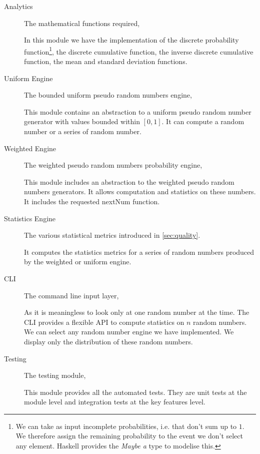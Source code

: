 \documentclass[12pt,a4paper,titlepage]{article}
\begin{document}
\begin{description}
	\item[Analytics] The mathematical functions required,
	
	In this module we have the implementation of the discrete 
	probability function\footnote{
	We can take as input incomplete probabilities, i.e. that
	don't sum up to $1$. We therefore assign the remaining
	probability to the event we don't select any element.
	Haskell provides the \emph{Maybe a} type to modelise this.
	}, the discrete cumulative function, 
	the inverse discrete cumulative function, the mean and
	standard deviation functions.
	
	\item[Uniform Engine] The bounded uniform 
	pseudo random numbers engine,
	
	This module contains an abstraction to a uniform pseudo
	random number generator with values bounded 
	within $ \left[ 0, 1 \right]$.
	It can compute a random number or a series of random 
	number.
	
	\item[Weighted Engine] 	The weighted pseudo random 
	numbers probability engine,
	
	This module includes an abstraction to the weighted 
	pseudo random numbers generators.
	It allows computation and statistics on these numbers.
	It includes the requested nextNum function.
	\item[Statistics Engine] The various statistical metrics
	introduced in \autoref{sec:quality}.
	
	It computes the statistics metrics for a series of 
	random numbers produced by the weighted or
	uniform engine.
	\item[CLI] 		The command line input layer,
	
	As it is meaningless to look only at one random number at the time.
	The CLI provides a flexible API to compute
	statistics on $n$ random numbers.
	We can select any random number engine we have implemented.
	We display only the distribution of these random numbers.
	\item[Testing] 	The testing module,
	
	This module provides all the automated tests. They are unit 
	tests at the module level and integration tests at the key
	features level.
\end{description}
\end{document}
